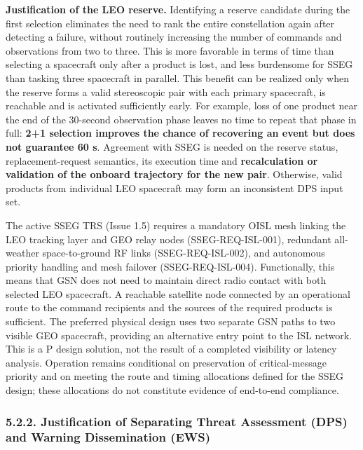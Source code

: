\textbf{Justification of the LEO reserve.} Identifying a reserve candidate during the first selection eliminates the need to rank the entire constellation again after detecting a failure, without routinely increasing the number of commands and observations from two to three. This is more favorable in terms of time than selecting a spacecraft only after a product is lost, and less burdensome for SSEG than tasking three spacecraft in parallel. This benefit can be realized only when the reserve forms a valid stereoscopic pair with each primary spacecraft, is reachable and is activated sufficiently early. For example, loss of one product near the end of the 30-second observation phase leaves no time to repeat that phase in full: \textbf{2+1 selection improves the chance of recovering an event but does not guarantee 60 s}. Agreement with SSEG is needed on the reserve status, replacement-request semantics, its execution time and \textbf{recalculation or validation of the onboard trajectory for the new pair}. Otherwise, valid products from individual LEO spacecraft may form an inconsistent DPS input set.

The active SSEG TRS (Issue 1.5) requires a mandatory OISL mesh linking the LEO tracking layer and GEO relay nodes (SSEG-REQ-ISL-001), redundant all-weather space-to-ground RF links (SSEG-REQ-ISL-002), and autonomous priority handling and mesh failover (SSEG-REQ-ISL-004). Functionally, this means that GSN does not need to maintain direct radio contact with both selected LEO spacecraft. A reachable satellite node connected by an operational route to the command recipients and the sources of the required products is sufficient. The preferred physical design uses two separate GSN paths to two visible GEO spacecraft, providing an alternative entry point to the ISL network. This is a P design solution, not the result of a completed visibility or latency analysis. Operation remains conditional on preservation of critical-message priority and on meeting the route and timing allocations defined for the SSEG design; these allocations do not constitute evidence of end-to-end compliance.

\subsubsection{5.2.2. Justification of Separating Threat Assessment (DPS) and Warning Dissemination (EWS)}\label{ddjf-5-2-2}

